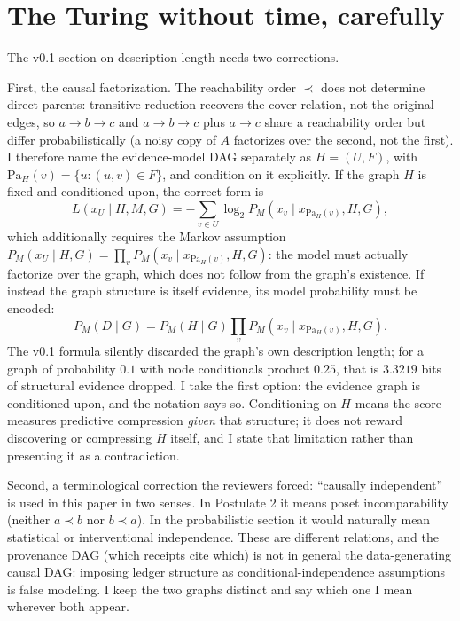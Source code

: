 \documentclass[11pt]{article}
\begin{document}
\section{The Turing without time, carefully}

The v0.1 section on description length needs two corrections.

First, the causal factorization. The reachability order $\prec$ does not determine direct parents: transitive reduction recovers the cover relation, not the original edges, so $a \to b \to c$ and $a \to b \to c$ plus $a \to c$ share a reachability order but differ probabilistically (a noisy copy of $A$ factorizes over the second, not the first). I therefore name the evidence-model DAG separately as $H = (U, F)$, with $\mathrm{Pa}_H(v) = \{u : (u,v) \in F\}$, and condition on it explicitly. If the graph $H$ is fixed and conditioned upon, the correct form is
\[
L(x_U \mid H, M, G) = -\sum_{v \in U} \log_2 P_M(x_v \mid x_{\mathrm{Pa}_H(v)}, H, G),
\]
which additionally requires the Markov assumption $P_M(x_U \mid H, G) = \prod_v P_M(x_v \mid x_{\mathrm{Pa}_H(v)}, H, G)$: the model must actually factorize over the graph, which does not follow from the graph's existence. If instead the graph structure is itself evidence, its model probability must be encoded:
\[
P_M(D \mid G) = P_M(H \mid G) \prod_v P_M(x_v \mid x_{\mathrm{Pa}_H(v)}, H, G).
\]
The v0.1 formula silently discarded the graph's own description length; for a graph of probability $0.1$ with node conditionals product $0.25$, that is $3.3219$ bits of structural evidence dropped. I take the first option: the evidence graph is conditioned upon, and the notation says so. Conditioning on $H$ means the score measures predictive compression \textit{given} that structure; it does not reward discovering or compressing $H$ itself, and I state that limitation rather than presenting it as a contradiction.

Second, a terminological correction the reviewers forced: ``causally independent'' is used in this paper in two senses. In Postulate 2 it means poset incomparability (neither $a \prec b$ nor $b \prec a$). In the probabilistic section it would naturally mean statistical or interventional independence. These are different relations, and the provenance DAG (which receipts cite which) is not in general the data-generating causal DAG: imposing ledger structure as conditional-independence assumptions is false modeling. I keep the two graphs distinct and say which one I mean wherever both appear.
\end{document}
